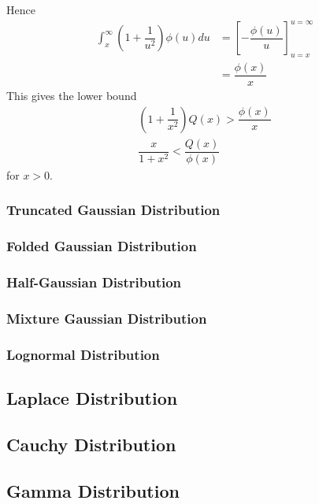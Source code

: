 \documentclass[11pt]{report} %
\begin{document}
Hence
\begin{align}
\int_{x}^{\infty}\left(1 + \dfrac{1}{u^{2}}\right)\phi\left(u\right)du &= \left[-\dfrac{\phi\left(u\right)}{u}\right]_{u = x}^{u = \infty} \\
&= \dfrac{\phi\left(x\right)}{x}
\end{align}
This gives the lower bound
\begin{gather}
\left(1 + \dfrac{1}{x^{2}}\right)Q\left(x\right) > \dfrac{\phi\left(x\right)}{x} \\
\dfrac{x}{1 + x^{2}} < \dfrac{Q\left(x\right)}{\phi\left(x\right)}
\end{gather}
for $x > 0$.

\subsubsection{Truncated Gaussian Distribution}

\subsubsection{Folded Gaussian Distribution}

\subsubsection{Half-Gaussian Distribution}

\subsubsection{Mixture Gaussian Distribution}

\subsubsection{Lognormal Distribution}

\subsection{Laplace Distribution}

\subsection{Cauchy Distribution}

\subsection{Gamma Distribution}
\end{document}
